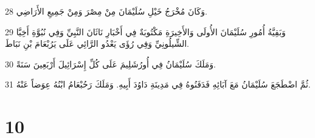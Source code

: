 \par 28 وَكَانَ مُخْرَجُ خَيْلِ سُلَيْمَانَ مِنْ مِصْرَ وَمِنْ جَمِيعِ الأَرَاضِي.
\par 29 وَبَقِيَّةُ أُمُورِ سُلَيْمَانَ الأُولَى وَالأَخِيرَةِ مَكْتُوبَةٌ فِي أَخْبَارِ نَاثَانَ النَّبِيِّ وَفِي نُبُوَّةِ أَخِيَّا الشِّيلُونِيِّ وَفِي رُؤَى يَعْدُو الرَّائِي عَلَى يَرُبْعَامَ بْنِ نَبَاطَ.
\par 30 وَمَلَكَ سُلَيْمَانُ فِي أُورُشَلِيمَ عَلَى كُلِّ إِسْرَائِيلَ أَرْبَعِينَ سَنَةً.
\par 31 ثُمَّ اضْطَجَعَ سُلَيْمَانُ مَعَ آبَائِهِ فَدَفَنُوهُ فِي مَدِينَةِ دَاوُدَ أَبِيهِ. وَمَلَكَ رَحُبْعَامُ ابْنُهُ عِوَضاً عَنْهُ.

\chapter{10}

